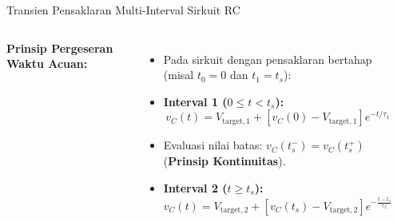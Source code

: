 \documentclass[aspectratio=169,10pt]{beamer}
\begin{document}
\begin{frame}{Transien Pensaklaran Multi-Interval Sirkuit RC}
  \begin{columns}[c]
    \textbf{Prinsip Pergeseran Waktu Acuan:}
    \begin{itemize}
      \item Pada sirkuit dengan pensaklaran bertahap (misal $t_0 = 0$ dan $t_1 = t_s$):
      \item \textbf{Interval 1 ($0 \le t < t_s$):}
      \begin{equation*}
        v_C(t) = V_{\text{target},1} + [v_C(0) - V_{\text{target},1}] e^{-t/\tau_1}
      \end{equation*}
      \item Evaluasi nilai batas: $v_C(t_s^-) = v_C(t_s^+)$ (\textbf{Prinsip Kontinuitas}).
      \item \textbf{Interval 2 ($t \ge t_s$):}
      \begin{equation*}
        v_C(t) = V_{\text{target},2} + [v_C(t_s) - V_{\text{target},2}] e^{-\frac{t - t_s}{\tau_2}}
      \end{equation*}
    \end{itemize}

    \begin{center}
    \end{center}
  \end{columns}
\end{frame}
\end{document}
